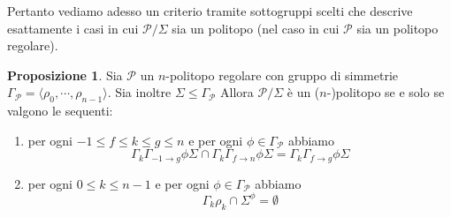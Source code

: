 \documentclass[a4paper,12pt]{report}
\newcommand{\p}{\mathcal{P}}
\theoremstyle{plain}
\theoremstyle{definition}
\newtheorem{prop}[teo]{Proposizione}
\newcommand\locallabel[1]{\label{\currentprefix_#1}}
\begin{document}
Pertanto vediamo adesso un criterio tramite sottogruppi scelti che descrive esattamente i casi in cui $\p/\Sigma$ sia un politopo
(nel caso in cui $\p$ sia un politopo regolare).
\begin{prop}
\label{prop:QuotientRegularIsPoly}
Sia $\p$ un $n$-politopo regolare con gruppo di simmetrie $\Gamma_\p=\langle\rho_0,\cdots,\rho_{n-1}\rangle$. Sia inoltre $\Sigma\leq\Gamma_\p$
Allora $\p/\Sigma$ \`e un ($n$-)politopo se e solo se valgono le sequenti:
\begin{enumerate}
\item\locallabel{1} per ogni $-1\leq f\leq k\leq g\leq n$ e per ogni $\phi\in\Gamma_\p$ abbiamo
\begin{equation*}
\Gamma_k\Gamma_{-1\rightarrow g}\phi\Sigma\cap\Gamma_k\Gamma_{f\rightarrow n}\phi\Sigma=\Gamma_k\Gamma_{f\rightarrow g}\phi\Sigma
\end{equation*}
\item\locallabel{2} per ogni $0\leq k\leq n-1$ e per ogni $\phi\in\Gamma_\p$ abbiamo
\begin{equation*}
\Gamma_k\rho_k\cap\Sigma^\phi=\emptyset
\end{equation*}
\end{enumerate}
\end{prop}
\end{document}
